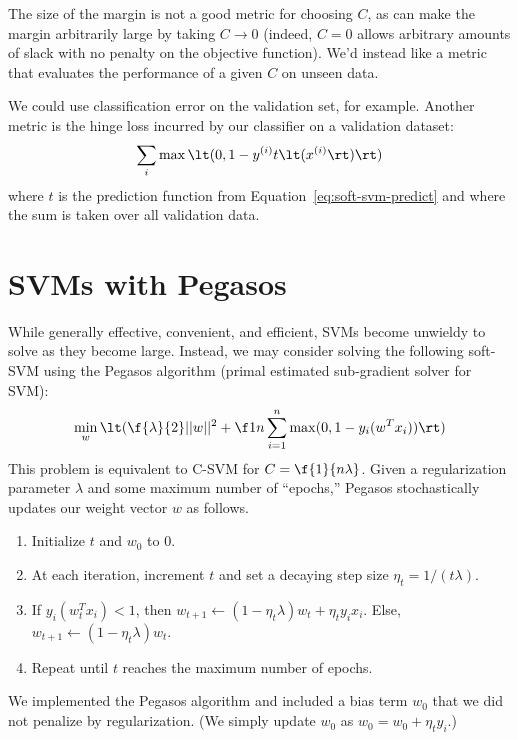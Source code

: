 \documentclass{article}
\newcommand{\sind}[1]{^{(#1)}}
\begin{document}
\begin{multicols}{2}
The size of the margin
is not a good metric for choosing $C$,
as can make the margin arbitrarily large
by taking $C \to 0$
(indeed, $C = 0$ allows arbitrary amounts of slack
with no penalty on the objective function).
We'd instead like a metric that evaluates
the performance of a given $C$
on unseen data.

We could use classification error on the validation set, for example.
Another metric is the hinge loss incurred
by our classifier on a validation dataset:
\begin{equation}
    \sum_{i} \max\lt(0, 1 - y\sind{i} t\lt(x\sind{i}\rt)\rt)
\end{equation}
where $t$ is the prediction function from Equation~\ref{eq:soft-svm-predict}
and where the sum is taken over all validation data.




\section{SVMs with Pegasos}

While generally effective, convenient, and efficient,
SVMs become unwieldy to solve as they become large.
Instead, we may consider solving the following soft-SVM
using the Pegasos algorithm
(primal estimated sub-gradient solver for SVM):
\begin{equation}
   \min_w \lt( \f{\lambda}{2}||w||^2 + \f1n\sum_{i=1}^n{\max(0,1-y_i(w^Tx_i))} \rt)
\end{equation}
This problem is equivalent to C-SVM for $C= \f{1}{n\lambda}$.
Given a regularization parameter $\lambda$
and some maximum number of ``epochs,''
Pegasos stochastically updates our weight vector $w$ as follows.
\begin{enumerate}
    \item
    Initialize $t$ and $w_0$ to 0.
    \item
    At each iteration,
    increment $t$ and set a decaying step size $\eta_t = 1/(t\lambda)$.
    \item
    If $y_i(w_t^Tx_i)<1$,
    then $w_{t+1}\leftarrow(1-\eta_t\lambda)w_t+\eta_ty_ix_i$.
    Else, $w_{t+1}\leftarrow(1-\eta_t\lambda)w_t$.
    \item
    Repeat until $t$ reaches the maximum number of epochs.
\end{enumerate}
We implemented the Pegasos algorithm and included a bias term $w_0$
that we did not penalize by regularization.
(We simply update $w_0$ as $w_0 = w_0 + \eta_t y_i$.)


\end{multicols}
\end{document}
